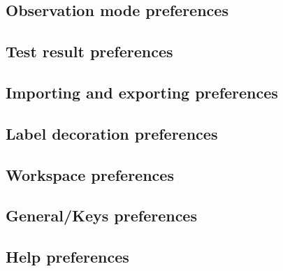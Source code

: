 \subsection{Observation mode preferences}
\label{TasksPrefsObsModeJava}


\subsection{Test result preferences}
\label{testresprefs}


\subsection{Importing and exporting \gddb{} preferences}
\label{TasksPrefsImport}


\subsection{Label decoration preferences}
\label{TasksPrefsDecoration}
 

\subsection{Workspace preferences}
\label{TasksPrefsWorkspace}



\subsection{General/Keys preferences}


\subsection{Help preferences}

